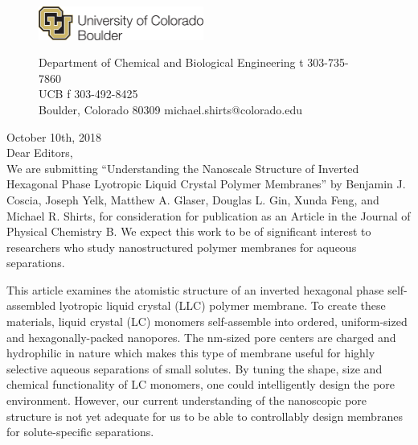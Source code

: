 \documentclass[fontsize=11pt]{article}
\begin{document}
	\graphicspath{{./figures/}}

	\begin{figure}
	\centering
	\begin{minipage}{0.37\textwidth}
	\includegraphics[width=2.14in,left]{CUBoulder.pdf}
	\end{minipage}
	\begin{minipage}{0.62\textwidth}
	\scriptsize
	\noindent Department of Chemical and Biological Engineering \hfill t 303-735-7860~~~~~~~~~~~~~~~~~~ \\
	 UCB \hfill f 303-492-8425~~~~~~~~~~~~~~~~~~ \\
	\noindent Boulder, Colorado 80309 \hfill michael.shirts@colorado.edu \\
	\end{minipage}
	\end{figure}
	
	\noindent October 10th, 2018\\

	\noindent Dear Editors,\\
	
	We are submitting ``Understanding the Nanoscale Structure of Inverted Hexagonal 
	Phase Lyotropic Liquid Crystal Polymer Membranes'' by Benjamin J. Coscia, Joseph
	Yelk, Matthew A. Glaser, Douglas L. Gin, Xunda Feng, and Michael R. Shirts, for
	consideration for publication as an Article in the Journal of Physical Chemistry
	B. We expect this work to be of significant interest to researchers who study 
	nanostructured polymer membranes for aqueous separations.
	
	This article examines the atomistic structure of an inverted hexagonal phase 
	self-assembled lyotropic liquid crystal (LLC) polymer membrane. To create these
	materials, liquid crystal (LC) monomers self-assemble into ordered, uniform-sized
	and hexagonally-packed nanopores. The nm-sized pore centers are charged and hydrophilic 
	in nature which makes this type of membrane useful for highly selective aqueous 
	separations of small solutes. By tuning the shape, size and chemical functionality
	of LC monomers, one could intelligently design the pore environment. However, our 
	current understanding of the nanoscopic pore structure is not yet adequate for us to
	be able to controllably design membranes for solute-specific separations.
	
\end{document}
